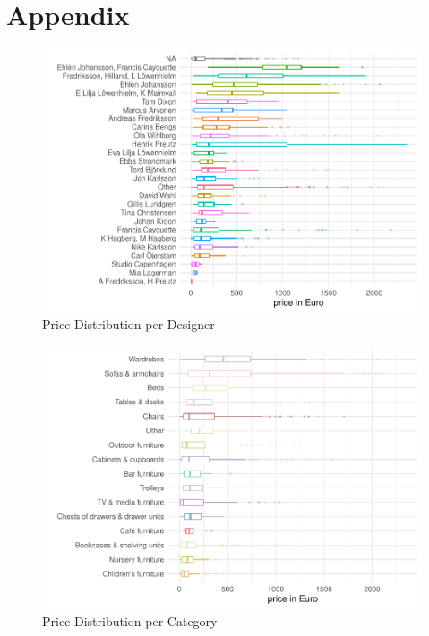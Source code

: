 \documentclass[a4paper, nobind]{templates/ociamthesis}
\begin{document}
\startappendices

\hypertarget{appendix}{%
\chapter{Appendix}\label{appendix}}

\begin{figure}
\includegraphics[width=1\linewidth]{_main_files/figure-latex/price-dist-per-designer-1} \caption{Price Distribution per Designer}\label{fig:price-dist-per-designer}
\end{figure}

\begin{figure}
\includegraphics[width=1\linewidth]{_main_files/figure-latex/price-dist-per-category-1} \caption{Price Distribution per Category}\label{fig:price-dist-per-category}
\end{figure}
\end{document}
